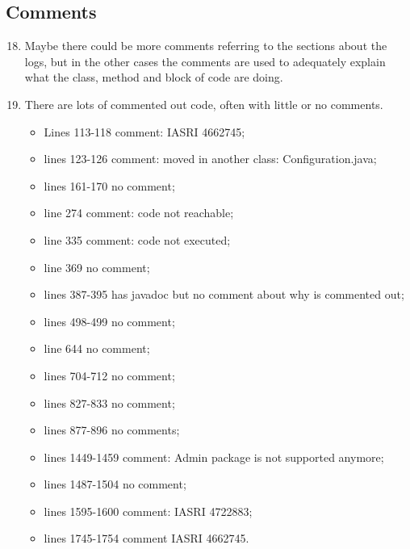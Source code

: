 \subsection{Comments}
\begin{enumerate}
	\setcounter{enumi}{17}
	\item Maybe there could be more comments referring to the sections about the logs, but in the other cases the comments are used to adequately explain what the class, method and block of code are doing.
	\item There are lots of commented out code, often with little or no comments.
	\begin{itemize}
		\item Lines 113-118 comment: IASRI 4662745;
		\item lines 123-126 comment: moved in another class: Configuration.java;
		\item lines 161-170 no comment;
		\item line 274 comment: code not reachable;
		\item line 335 comment: code not executed;
		\item line 369 no comment;
		\item lines 387-395 has javadoc but no comment about why is commented out;
		\item lines 498-499 no comment;
		\item line 644 no comment;
		\item lines 704-712 no comment;
		\item lines 827-833 no comment;
		\item lines 877-896 no comments;
		\item lines 1449-1459 comment: Admin package is not supported anymore;
		\item lines 1487-1504 no comment;
		\item lines 1595-1600 comment: IASRI 4722883;
		\item lines 1745-1754 comment IASRI 4662745.
	\end{itemize}
\end{enumerate}
